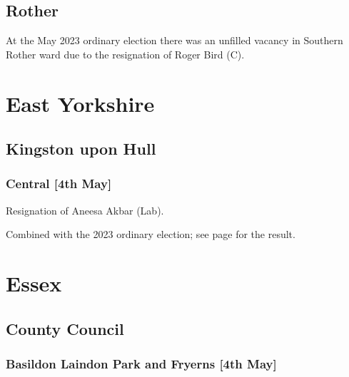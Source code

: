 \documentclass[a4paper,openany]{book}
\begin{document}
\begin{resultsiii}
\subsection*{Rother}

At the May 2023 ordinary election there was an unfilled vacancy in Southern Rother ward due to the resignation of Roger Bird (C).%

\section{East Yorkshire}

\subsection*{Kingston upon Hull}

\subsubsection*{Central \hspace*{\fill}\nolinebreak[1]%
	\enspace\hspace*{\fill}
	[4th May]}


Resignation of Aneesa Akbar (Lab).

Combined with the 2023 ordinary election; see page \pageref{KignstonHullCentral} for the result.

\section{Essex}

\subsection*{County Council}

\subsubsection*{Basildon Laindon Park and Fryerns \hspace*{\fill}\nolinebreak[1]%
	\enspace\hspace*{\fill}
	[4th May]}



\end{resultsiii}
\end{document}
